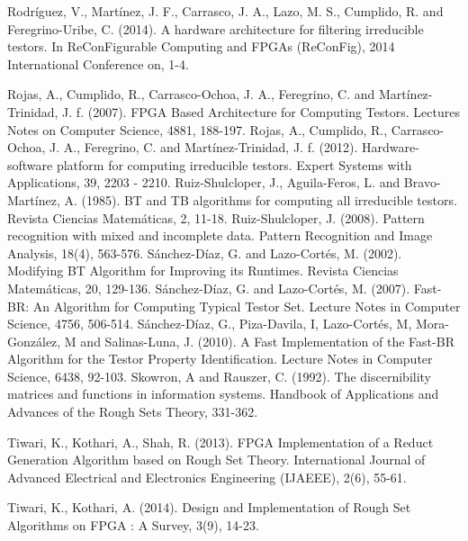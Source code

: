 \documentclass[authoryear,preprint,review,12pt]{elsarticle}
\begin{document}
\begin{thebibliography}{00}
 Rodr\'iguez, V., Mart\'inez, J. F., Carrasco, J. A., Lazo, M. S., Cumplido, R. and Feregrino-Uribe, C. (2014). A hardware architecture for filtering irreducible testors. In ReConFigurable Computing and FPGAs (ReConFig), 2014 International Conference on, 1-4.

Rojas, A., Cumplido, R., Carrasco-Ochoa, J. A., Feregrino, C. and Mart\'inez-Trinidad, J. f. (2007). FPGA Based Architecture for Computing Testors. Lectures Notes on Computer Science, 4881, 188-197.
Rojas, A., Cumplido, R., Carrasco-Ochoa, J. A., Feregrino, C. and Mart\'inez-Trinidad, J. f. (2012). Hardware-software platform for computing irreducible testors. Expert Systems with Applications, 39, 2203 - 2210.
Ruiz-Shulcloper, J., Aguila-Feros, L. and Bravo-Mart\'inez, A. (1985). BT and TB algorithms for computing all irreducible testors. Revista Ciencias Matem\'aticas, 2, 11-18.
Ruiz-Shulcloper, J. (2008). Pattern recognition with mixed and incomplete data. Pattern Recognition and Image Analysis, 18(4), 563-576.
S\'anchez-D\'iaz, G. and Lazo-Cort\'es, M. (2002). Modifying BT Algorithm for Improving its Runtimes. Revista Ciencias Matem\'aticas, 20, 129-136.
S\'anchez-D\'iaz, G. and Lazo-Cort\'es, M. (2007). Fast-BR: An Algorithm for Computing Typical Testor Set. Lecture Notes in Computer Science, 4756, 506-514.
S\'anchez-D\'iaz, G., Piza-Davila, I, Lazo-Cort\'es, M, 
Mora-Gonz\'alez, M and Salinas-Luna, J. (2010). A Fast Implementation of the Fast-BR Algorithm for the Testor Property Identification. Lecture Notes in Computer Science, 6438, 92-103.
Skowron, A and Rauszer, C. (1992). The discernibility matrices and functions in information systems. Handbook of Applications and Advances of the Rough Sets Theory, 331-362.

Tiwari, K., Kothari, A., Shah, R. (2013). FPGA Implementation of a Reduct Generation Algorithm based on Rough Set Theory. International Journal of Advanced Electrical and Electronics Engineering (IJAEEE), 2(6), 55-61.

 Tiwari, K., Kothari, A. (2014). Design and Implementation of Rough Set Algorithms on FPGA : A Survey, 3(9), 14-23.


\end{thebibliography}
\end{document}
